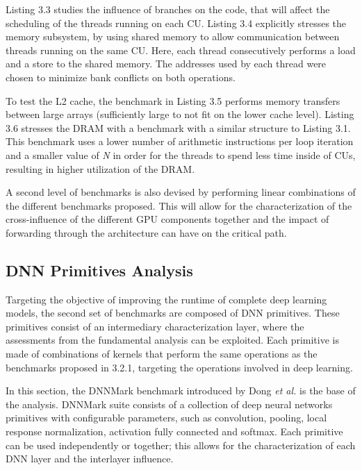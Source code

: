 Listing 3.3 studies the influence of branches on the code, that will affect the scheduling of the threads running on each CU. Listing 3.4 explicitly stresses the memory subsystem, by using shared memory to allow communication between threads running on the same CU. Here, each thread consecutively performs a load and a store to the shared memory. The addresses used by each thread were chosen to minimize bank conflicts on both operations.

To test the L2 cache, the benchmark in Listing 3.5 performs memory transfers between large arrays (sufficiently large to not fit on the lower cache level). Listing 3.6 stresses the DRAM with a benchmark with a similar structure to Listing 3.1. This benchmark uses a lower number of arithmetic instructions per loop iteration and a smaller value of \textit{N} in order for the threads to spend less time inside of CUs, resulting in higher utilization of the DRAM.

A second level of benchmarks is also devised by performing linear combinations of the different benchmarks proposed. This will allow for the characterization of the cross-influence of the different GPU components together and the impact of forwarding through the architecture can have on the critical path.





\subsection{DNN Primitives Analysis}
\label{sec:dnnPri}

Targeting the objective of improving the runtime of complete deep learning models, the second set of benchmarks are composed of DNN primitives. These primitives consist of an intermediary characterization layer, where the assessments from the fundamental analysis can be exploited. Each primitive is made of combinations of kernels that perform the same operations as the benchmarks proposed in 3.2.1, targeting the operations involved in deep learning. 

In this section, the DNNMark benchmark introduced by Dong \textit{et al.} \cite{dong_dnnmark:_2017} is the base of the analysis. DNNMark suite consists of a collection of deep neural networks primitives with configurable parameters, such as convolution, pooling, local response normalization, activation fully connected and softmax. Each primitive can be used independently or together; this allows for the characterization of each DNN layer and the interlayer influence.


